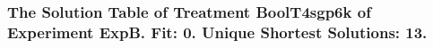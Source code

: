  \begin{frame}
 \fontsize{8pt}{9pt}\selectfont
 \frametitle{ The Solution Table of Treatment BoolT4sgp6k of Experiment ExpB. Fit: 0. Unique Shortest Solutions: 13. }

 \label{ExpBSolutionTable024.tex}  
 \end{frame}

